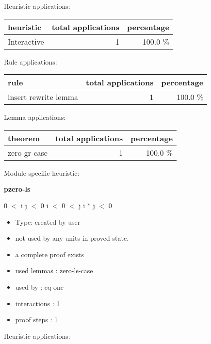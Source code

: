 \documentclass[a4paper]{article}
\begin{document}
\medskip


Heuristic applications:

\begin{supertabular}{l|r|r}
heuristic	& total applications & percentage \\ \hline
Interactive & 1 & 100.0 \% \\

\end{supertabular}

Rule applications:

\begin{supertabular}{l|r|r}
rule	        & total applications & percentage \\ \hline
insert rewrite lemma & 1 & 100.0 \% \\

\end{supertabular}

Lemma applications:

\begin{supertabular}{l|r|r}
theorem	        & total applications & percentage \\ \hline
zero-gr-case & 1 & 100.0 \% \\

\end{supertabular}

Module specific heuristic:

\pagebreak

{\LARGE\bf pzero-ls}\label{lemma-pzero-ls}

\medskip

0 $<$ i \And j $<$ 0 \Or i $<$ 0  $<$ j \Fol i $*$ j $<$ 0

\begin{itemize}

\item Type: created by user

\item not used by any units in proved state.
\item       a complete proof exists
\item       used lemmas  : zero-ls-case
\item       used by      : eq-one
\item       interactions : 1
\item       proof steps  : 1
\end{itemize}

\medskip


Heuristic applications:
\end{document}
